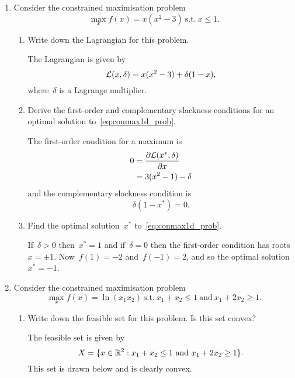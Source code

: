 
\begin{enumerate}

	\item
	Consider the constrained maximisation problem
	\[ \max_xf(x)=x(x^2-3)\ \text{s.t.}\ x\le1. 
		\label{eq:conmax1d_prob} \]
	\begin{enumerate}

		\item
		Write down the Lagrangian for this problem.
		\begin{solution}
			The Lagrangian is given by
			\[ \Lcal(x,\delta)=x(x^2-3)+\delta(1-x), \]
			where~$\delta$ is a Lagrange multiplier.
		\end{solution}

		\item
		Derive the first-order and complementary slackness conditions for an optimal solution to~\eqref{eq:conmax1d_prob}.
		\begin{solution}
			The first-order condition for a maximum is
			\begin{align}
				0
				&= \pder{\Lcal(x^*,\delta)}{x}\\
				&= 3(x^2-1)-\delta
			\end{align}
			and the complementary slackness condition is
			\[ \delta(1-x^*)=0. \]
		\end{solution}

		\item
		Find the optimal solution~$x^*$ to~\eqref{eq:conmax1d_prob}.
		\begin{solution}
			If~$\delta>0$ then~$x^*=1$ and if~$\delta=0$ then the first-order condition has roots~$x=\pm1$.
			Now~$f(1)=-2$ and~$f(-1)=2$, and so the optimal solution~$x^*=-1$.
		\end{solution}

	\end{enumerate}

	\item
	Consider the constrained maximisation problem
	\[ \max_xf(x)%
		=\ln(x_1x_2)\ \text{s.t.}\ %
			x_1+x_2\le1\ \text{and}\ x_1+2x_2\ge1. 
		\label{eq:conmax2d_prob} \]
	\begin{enumerate}

		\item
		Write down the feasible set for this problem.
		Is this set convex?
		\begin{solution}
			The feasible set is given by
			\[ X=\{x\in\R^2:x_1+x_2\le1\ \text{and}\ x_1+2x_2\ge1\}. \]
			This set is drawn below and is clearly convex.
			\begin{center}
				\begin{tikzpicture}[scale=1.5]


\end{tikzpicture}
\end{center}
\end{solution}
\end{enumerate}
\end{enumerate}

